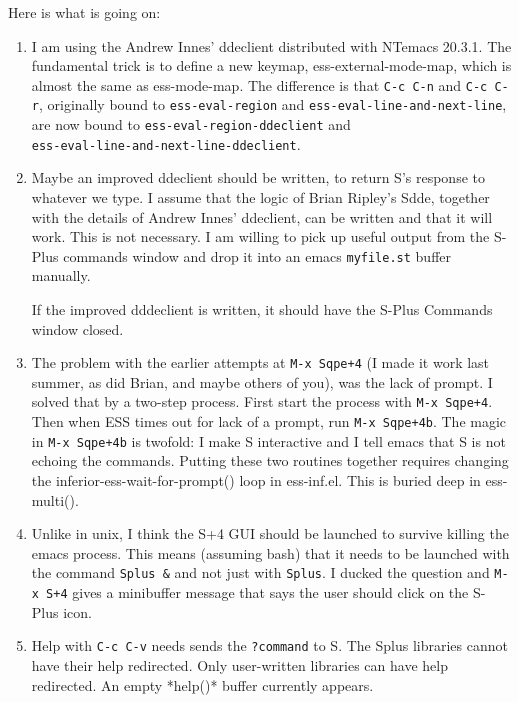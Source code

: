 \documentclass[12pt]{article}         %
\newcommand{\tty}[1]{{\tt #1}}
\begin{document}
Here is what is going on:
\begin{enumerate}
\item
I am using the Andrew Innes' ddeclient distributed with NTemacs
20.3.1.  The fundamental trick is to define a new keymap,
ess-external-mode-map, which is almost the same as ess-mode-map.  The
difference is that \tty{C-c C-n} and \tty{C-c C-r}, originally bound
to \tty{ess-eval-region} and \tty{ess-eval-line-and-next-line},\\
are now bound to \tty{ess-eval-region-ddeclient} and\\
\tty{ess-eval-line-and-next-line-ddeclient}.

\item
Maybe an improved ddeclient should be written, to return S's response
to whatever we type.  I assume that the logic of
Brian Ripley's Sdde, together with the details of Andrew Innes'
ddeclient, can be written and that it will work.
This is not necessary.  I am willing to pick up useful output from the S-Plus commands
window and drop it into an emacs \tty{myfile.st} buffer manually.

If the improved dddeclient is written,
it should have the S-Plus Commands window closed.


\item
The problem with the earlier attempts at \tty{M-x Sqpe+4} (I made it
work last summer, as did Brian, and maybe others of you), was the lack
of prompt.  I solved that by a two-step process.  First start the
process with \tty{M-x Sqpe+4}.  Then when ESS times out for lack of a
prompt, run \tty{M-x Sqpe+4b}.  The magic in \tty{M-x Sqpe+4b} is
twofold: I make S interactive and I tell emacs that S is not echoing
the commands.  Putting these two routines together requires changing
the inferior-ess-wait-for-prompt() loop in ess-inf.el.  This is buried deep
in ess-multi().

\item
Unlike in unix, I think the S+4 GUI should be launched to survive
killing the emacs process.  This means (assuming bash) that it needs
to be launched with the command \tty{Splus \&} and not just with
\tty{Splus}.  I ducked the question and \tty{M-x S+4} gives a minibuffer
message that says the user should click on the S-Plus icon.

\item
Help with \tty{C-c C-v} needs sends the
\tty{?command} to S.  The Splus libraries cannot have their help
redirected.  Only user-written libraries can have help redirected.
An empty *help()* buffer currently appears.


\end{enumerate}
\end{document}
